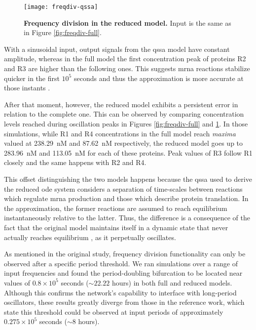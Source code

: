     \begin{figure}[!htbp]
      \centering
      \texttt{[image: freqdiv-qssa]}
      \caption{\textbf{Frequency division in the reduced model.} Input is the same as in Figure \ref{fig:freqdiv-full}.}
      \label{fig:freqdiv-qssa}
    \end{figure}

    With a sinusoidal input, output signals from the \ac{qssa} model have constant amplitude, whereas in the full model the first concentration peak of proteins R2 and R3 are higher than the following ones.
    This suggests \acs{mrna} reactions stabilize quicker in the first $10^5$ seconds and thus the approximation is more accurate at those instants \cite{ingalls}.

    After that moment, however, the reduced model exhibits a persistent error in relation to the complete one.
    This can be observed by comparing concentration levels reached during oscillation peaks in Figures \ref{fig:freqdiv-full} and \ref{fig:freqdiv-qssa}.
    In those simulations, while R1 and R4 concentrations in the full model reach \textit{maxima} valued at \SI{238.29}{\nano M} and \SI{87.62}{\nano M} respectively, the reduced model goes up to \SI{283.96}{\nano M} and \SI{113.05}{\nano M} for each of these proteins.
    Peak values of R3 follow R1 closely and the same happens with R2 and R4.

    This offset distinguishing the two models happens because the \ac{qssa} used to derive the reduced \ac{ode} system considers a separation of time-scales between reactions which regulate \acs{mrna} production and those which describe protein translation.
    In the approximation, the former reactions are assumed to reach equilibrium instantaneously relative to the latter.
    Thus, the difference is a consequence of the fact that the original model maintains itself in a dynamic state that never actually reaches equilibrium \cite{ingalls}, as it perpetually oscillates.

    As mentioned in the original study, frequency division functionality can only be observed after a specific period threshold.
    We ran simulations over a range of input frequencies and found the period-doubling bifurcation to be located near values of $0.8 \times 10^5$ seconds ($\sim 22.22$ hours) in both full and reduced models.
    Although this confirms the network's capability to interface with long-period oscillators, these results greatly diverge from those in the reference work, which state this threshold could be observed at input periods of approximately $0.275 \times 10^5$ seconds ($\sim 8$ hours).

